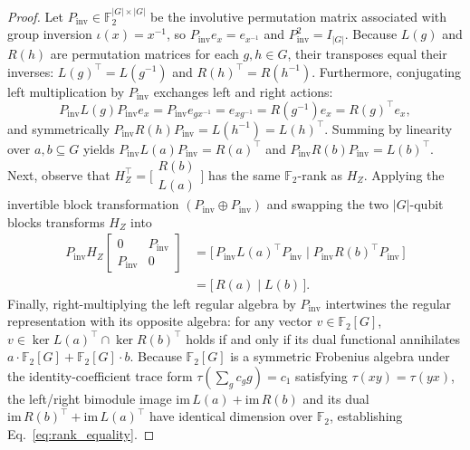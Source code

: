 \documentclass[aps,prapplied,reprint,longbibliography]{revtex4-2}
\begin{document}
\begin{proof}
Let $P_{\mathrm{inv}} \in \mathbb{F}_2^{|G|\times|G|}$ be the involutive permutation matrix associated with group inversion $\iota(x) = x^{-1}$, so $P_{\mathrm{inv}} e_x = e_{x^{-1}}$ and $P_{\mathrm{inv}}^2 = I_{|G|}$. Because $L(g)$ and $R(h)$ are permutation matrices for each $g, h \in G$, their transposes equal their inverses: $L(g)^\top = L(g^{-1})$ and $R(h)^\top = R(h^{-1})$. Furthermore, conjugating left multiplication by $P_{\mathrm{inv}}$ exchanges left and right actions:
\begin{equation}
P_{\mathrm{inv}} L(g) P_{\mathrm{inv}} e_x = P_{\mathrm{inv}} e_{g x^{-1}} = e_{x g^{-1}} = R(g^{-1}) e_x = R(g)^\top e_x,
\end{equation}
and symmetrically $P_{\mathrm{inv}} R(h) P_{\mathrm{inv}} = L(h^{-1}) = L(h)^\top$. Summing by linearity over $a, b \subseteq G$ yields $P_{\mathrm{inv}} L(a) P_{\mathrm{inv}} = R(a)^\top$ and $P_{\mathrm{inv}} R(b) P_{\mathrm{inv}} = L(b)^\top$. Next, observe that $H_Z^\top = \bigl[\begin{smallmatrix} R(b) \\ L(a) \end{smallmatrix}\bigr]$ has the same $\mathbb{F}_2$-rank as $H_Z$. Applying the invertible block transformation $(P_{\mathrm{inv}} \oplus P_{\mathrm{inv}})$ and swapping the two $|G|$-qubit blocks transforms $H_Z$ into
\begin{align}
P_{\mathrm{inv}} H_Z \begin{bmatrix} 0 & P_{\mathrm{inv}} \\ P_{\mathrm{inv}} & 0 \end{bmatrix}
&= \bigl[\,P_{\mathrm{inv}} L(a)^\top P_{\mathrm{inv}} \;\big|\; P_{\mathrm{inv}} R(b)^\top P_{\mathrm{inv}}\,\bigr] \nonumber\\
&= \bigl[\,R(a) \;\big|\; L(b)\,\bigr].
\end{align}
Finally, right-multiplying the left regular algebra by $P_{\mathrm{inv}}$ intertwines the regular representation with its opposite algebra: for any vector $v \in \mathbb{F}_2[G]$, $v \in \ker L(a)^\top \cap \ker R(b)^\top$ holds if and only if its dual functional annihilates $a \cdot \mathbb{F}_2[G] + \mathbb{F}_2[G] \cdot b$. Because $\mathbb{F}_2[G]$ is a symmetric Frobenius algebra under the identity-coefficient trace form $\tau(\sum_g c_g g) = c_1$ satisfying $\tau(xy)=\tau(yx)$, the left/right bimodule image $\mathrm{im}\,L(a) + \mathrm{im}\,R(b)$ and its dual $\mathrm{im}\,R(b)^\top + \mathrm{im}\,L(a)^\top$ have identical dimension over $\mathbb{F}_2$, establishing Eq.~\eqref{eq:rank_equality}.
\end{proof}
\end{document}
